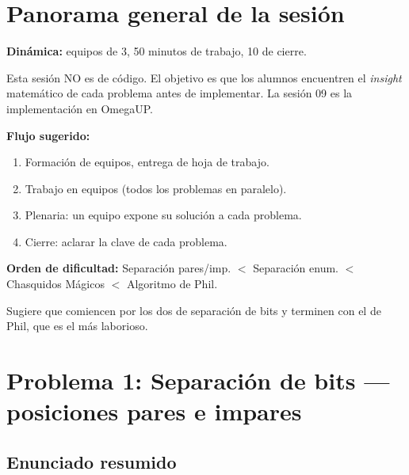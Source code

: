 \documentclass[12pt, oneside]{article}
\begin{document}

\tableofcontents
\newpage

\section{Panorama general de la sesión}

\begin{notaprofesor}
  \textbf{Dinámica:} equipos de 3, 50 minutos de trabajo, 10 de cierre.

  Esta sesión NO es de código.  El objetivo es que los alumnos encuentren
  el \textit{insight} matemático de cada problema antes de implementar.
  La sesión 09 es la implementación en OmegaUP.

  \textbf{Flujo sugerido:}
  \begin{enumerate}
    \item[0--5 min] Formación de equipos, entrega de hoja de trabajo.
    \item[5--45 min] Trabajo en equipos (todos los problemas en paralelo).
    \item[45--55 min] Plenaria: un equipo expone su solución a cada problema.
    \item[55--60 min] Cierre: aclarar la clave de cada problema.
  \end{enumerate}

  \textbf{Orden de dificultad:} Separación pares/imp. $<$ Separación enum. $<$
  Chasquidos Mágicos $<$ Algoritmo de Phil.

  Sugiere que comiencen por los dos de separación de bits y terminen con
  el de Phil, que es el más laborioso.
\end{notaprofesor}

\newpage

\section{Problema 1: Separación de bits — posiciones pares e impares}

\subsection{Enunciado resumido}
\end{document}

